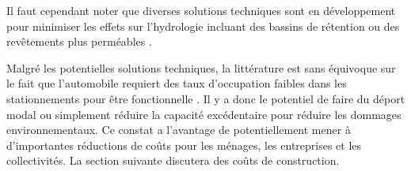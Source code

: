     Il faut cependant noter que diverses solutions techniques sont en développement pour minimiser les effets sur l'hydrologie incluant des bassins de rétention ou des revêtements plus perméables \parencite{biswal_nature-based_2022,wang_performance_2022}. \par
    Malgré les potentielles solutions techniques, la littérature est sans équivoque sur le fait que l'automobile requiert des taux d'occupation faibles dans les stationnements pour être fonctionnelle \parencite{heran_consommation_2008,davis_estimating_2010,hoehne_valley_2019}. Il y a donc le potentiel de faire du déport modal ou simplement réduire la capacité excédentaire pour réduire les dommages environnementaux. Ce constat a l'avantage de potentiellement mener à d'importantes réductions de coûts pour les ménages, les entreprises et les collectivités. La section suivante discutera des coûts de construction. 
    \newcommand{\TitreSommaireCoutsProvisions}{Sommaire des coûts de provision du stationnement dans les immeubles résidentiels}
